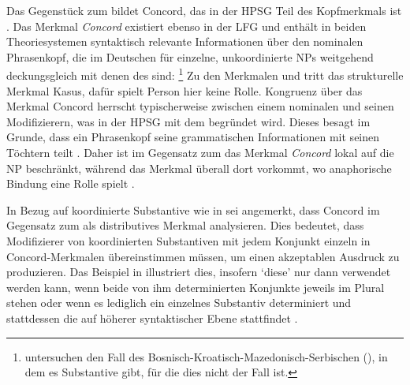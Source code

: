 \begin{exe}
\ex\label{ex:coordidx}
\begin{xlist}
\end{xlist}
\end{exe}


\label{phsec:concord}

Das Gegenstück zum  bildet Concord, das in der HPSG Teil des Kopfmerkmals ist
\autocite[17]{wechslerzlatic2003}. Das Merkmal \emph{Concord} existiert ebenso
in der LFG \autocite[189--192]{bresnanetal2016}
und enthält in beiden Theoriesystemen syntaktisch relevante Informationen über
den nominalen Phrasenkopf, die im Deutschen für
einzelne, unkoordinierte NPs weitgehend deckungsgleich mit
denen des  sind:%
%
	\footnote{\citet{wechslerzlatic2003} untersuchen den Fall des
	Bosnisch-Kroatisch-Mazedonisch-Serbischen (), in dem es
	Substantive gibt, für die dies nicht der Fall ist.}
%
Zu den Merkmalen  und  tritt das strukturelle Merkmal
Kasus, dafür spielt Person hier keine Rolle. Kongruenz über das Merkmal Concord
herrscht typischerweise zwischen einem nominalen  und seinen
Modifizierern, was in der HPSG mit dem
 begründet wird. Dieses besagt im Grunde, dass
ein Phrasenkopf seine grammatischen Informationen mit seinen Töchtern
teilt \autocites[vgl.][34]{pollardsag1994}[22]{wechslerzlatic2003}. Daher ist
im Gegensatz zum  das Merkmal \emph{Concord} lokal auf die
NP beschränkt, während das Merkmal \emph{} überall
dort vorkommt, wo anaphorische Bindung eine Rolle
spielt \parencites[14--16, 22]{wechslerzlatic2003}[189]{bresnanetal2016}.

In Bezug auf koordinierte Substantive wie in
 sei angemerkt, dass \citet[76--78]{kingdalrymple2004} Concord
im Gegensatz zum  als distributives Merkmal analysieren. Dies
bedeutet, dass Modifizierer von koordinierten Substantiven mit jedem Konjunkt
einzeln in Concord-Merkmalen übereinstimmen müssen, um einen akzeptablen
Ausdruck zu produzieren. Das Beispiel in  illustriert
dies, insofern  `diese' nur dann verwendet werden kann, wenn beide
von ihm determinierten Konjunkte jeweils im Plural stehen
 oder wenn es lediglich ein einzelnes Substantiv
determiniert und stattdessen die  auf höherer syntaktischer
Ebene stattfindet .

